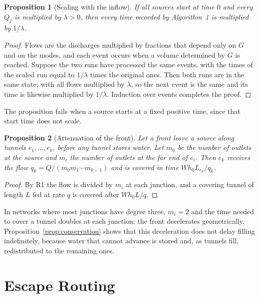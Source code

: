 \documentclass[11pt,a4paper]{article}
\theoremstyle{plain}
\newtheorem{proposition}{Proposition}
\theoremstyle{definition}
\theoremstyle{remark}
\begin{document}
\begin{proposition}[Scaling with the inflow]\label{prop:scaling}
If all sources start at time $0$ and every $Q_j$ is multiplied by $\lambda > 0$, then every time recorded by Algorithm~1 is multiplied by $1/\lambda$.
\end{proposition}
\begin{proof}
Flows are the discharges multiplied by fractions that depend only on $G$ and on the modes, and each event occurs when a volume determined by $G$ is reached. Suppose the two runs have processed the same events, with the times of the scaled run equal to $1/\lambda$ times the original ones. Then both runs are in the same state, with all flows multiplied by $\lambda$, so the next event is the same and its time is likewise multiplied by $1/\lambda$. Induction over events completes the proof.
\end{proof}

The proposition fails when a source starts at a fixed positive time, since that start time does not scale.

\begin{proposition}[Attenuation of the front]\label{prop:attenuation}
Let a front leave a source along tunnels $e_1, \dots, e_k$, before any tunnel stores water. Let $m_0$ be the number of outlets at the source and $m_i$ the number of outlets at the far end of $e_i$. Then $e_k$ receives the flow $q_k = Q/(m_0 m_1 \cdots m_{k-1})$ and is covered in time $W h_0 L_{e_k} / q_k$.
\end{proposition}
\begin{proof}
By R1 the flow is divided by $m_i$ at each junction, and a covering tunnel of length $L$ fed at rate $q$ is covered after $W h_0 L / q$.
\end{proof}

In networks where most junctions have degree three, $m_i = 2$ and the time needed to cover a tunnel doubles at each junction: the front decelerates geometrically. Proposition~\ref{prop:conservation} shows that this deceleration does not delay filling indefinitely, because water that cannot advance is stored and, as tunnels fill, redistributed to the remaining ones.

\section{Escape Routing}\label{sec:routing}
\end{document}
